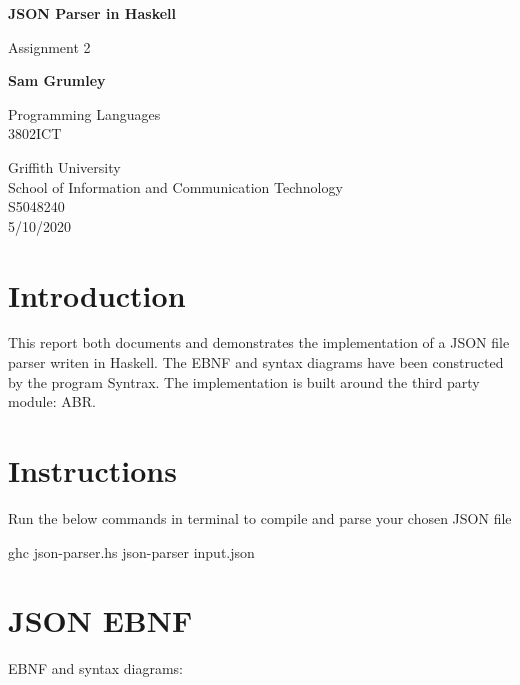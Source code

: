 \documentclass[a4paper]{article}
\begin{document}
\begin{titlepage}
    \begin{center}
        \vspace*{1cm}
            
        \Huge
        \textbf{JSON Parser in Haskell}
            
        \vspace{0.5cm}
        \LARGE
        Assignment 2
            
        \vspace{1.5cm}
            
        \textbf{Sam Grumley}
            
        \vfill
            
        Programming Languages\\
         3802ICT\\
            
        \vspace{0.8cm}
            
            
        \Large
         Griffith University\\
         School of Information and Communication Technology\\
         S5048240\\
         5/10/2020
            
    \end{center}
\end{titlepage}

\section{Introduction}
This report both documents and demonstrates the implementation of a JSON file parser writen in Haskell.
The EBNF and syntax diagrams have been constructed by the program Syntrax. 
The implementation is built around the third party module: ABR.

\section{Instructions}
Run the below commands in terminal to compile and parse your chosen JSON file
\begin{code}
ghc json-parser.hs 
json-parser input.json
\end{code}


\section{JSON EBNF}
EBNF and syntax diagrams:
\end{document}
